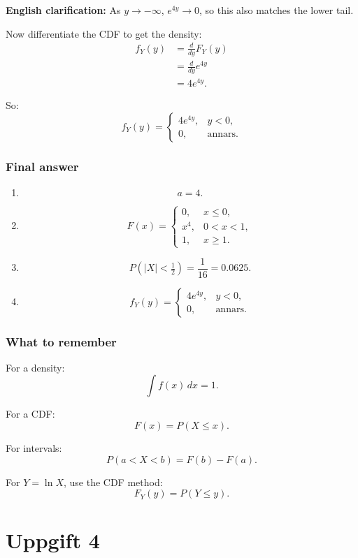 \documentclass[10pt]{article}
\begin{document}
\textbf{English clarification:}
As \(y\to -\infty\), \(e^{4y}\to 0\), so this also
matches the lower tail.

Now differentiate the CDF to get the density:
\begin{align*}
f_Y(y)
&=
\frac{d}{dy}F_Y(y)
\\[2mm]
&=
\frac{d}{dy}e^{4y}
\\[2mm]
&=
4e^{4y}.
\end{align*}

So:
\[
f_Y(y)=
\begin{cases}
4e^{4y},
& y<0,\\
0,
& \text{annars}.
\end{cases}
\]

\subsubsection*{Final answer}

\begin{enumerate}[label=\alph*)]
\item
\[
a=4.
\]

\item
\[
F(x)=
\begin{cases}
0,
& x\le 0,\\
x^4,
& 0<x<1,\\
1,
& x\ge 1.
\end{cases}
\]

\item
\[
P(|X|<\tfrac12)
=
\frac{1}{16}
=0.0625.
\]

\item
\[
f_Y(y)=
\begin{cases}
4e^{4y},
& y<0,\\
0,
& \text{annars}.
\end{cases}
\]
\end{enumerate}

\subsubsection*{What to remember}

For a density:
\[
\int f(x)\,dx=1.
\]

For a CDF:
\[
F(x)=P(X\le x).
\]

For intervals:
\[
P(a<X<b)=F(b)-F(a).
\]

For \(Y=\ln X\), use the CDF method:
\[
F_Y(y)=P(Y\le y).
\]

\section*{Uppgift 4}
\end{document}
